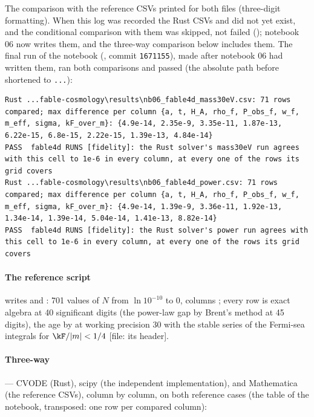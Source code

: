 The comparison with the reference CSVs printed
 for both files (three-digit
formatting). When this log was recorded the Rust CSVs  and
 did not yet exist, and the conditional comparison with them was skipped, not
failed (); notebook 06 now writes
them, and the three-way comparison below includes them. The final run of the notebook (, commit
\texttt{1671155}), made after notebook 06 had written them, ran both comparisons and passed (the absolute
path before  shortened to \texttt{...}):
\begin{Verbatim}
Rust ...fable-cosmology\results\nb06_fable4d_mass30eV.csv: 71 rows compared; max difference per column {a, t, H_A, rho_f, P_obs_f, w_f, m_eff, sigma, kF_over_m}: {4.9e-14, 2.35e-9, 3.35e-11, 1.87e-13, 6.22e-15, 6.8e-15, 2.22e-15, 1.39e-13, 4.84e-14}
PASS  fable4d RUNS [fidelity]: the Rust solver's mass30eV run agrees with this cell to 1e-6 in every column, at every one of the rows its grid covers
Rust ...fable-cosmology\results\nb06_fable4d_power.csv: 71 rows compared; max difference per column {a, t, H_A, rho_f, P_obs_f, w_f, m_eff, sigma, kF_over_m}: {4.9e-14, 1.39e-9, 3.36e-11, 1.92e-13, 1.34e-14, 1.39e-14, 5.04e-14, 1.41e-13, 8.82e-14}
PASS  fable4d RUNS [fidelity]: the Rust solver's power run agrees with this cell to 1e-6 in every column, at every one of the rows its grid covers
\end{Verbatim}

\paragraph{The reference script}  writes
 and : 701 values of $N$ from
$\ln10^{-10}$ to 0, columns ; every row is
exact algebra at 40 significant digits (the power-law gap by Brent's method at 45 digits), the age by
 at working precision 30 with the stable series of the Fermi-sea integrals for $\kF/|m|<1/4$
[file: its header].

\paragraph{Three-way}  --- CVODE (Rust), scipy (the
independent implementation), and Mathematica (the reference CSVs), column by column, on both reference cases
(the table of the notebook, transposed: one row per compared column):


